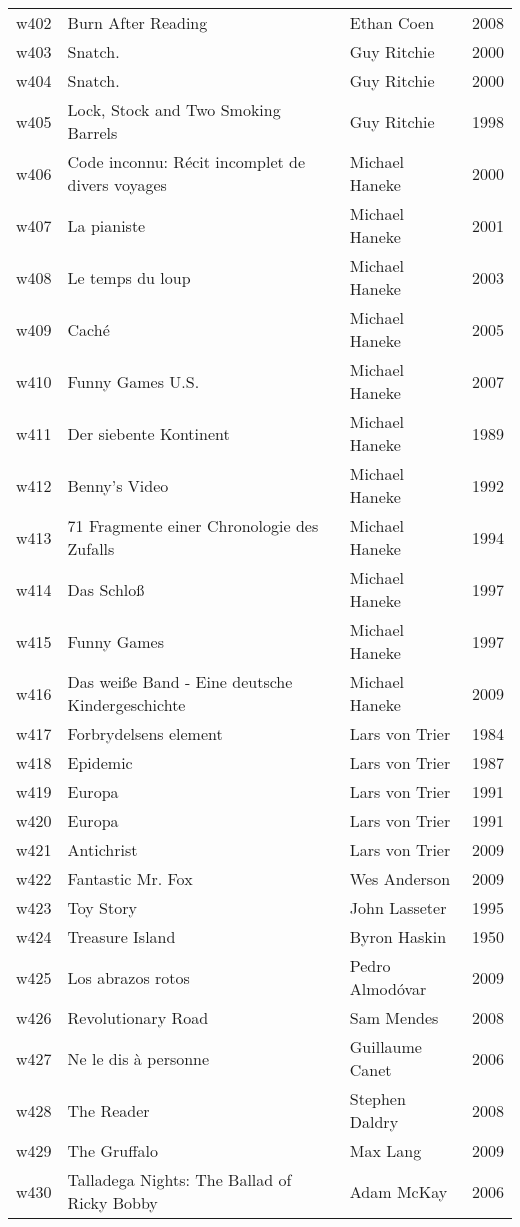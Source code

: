 \documentclass{article}
\begin{document}
\begin {center}
\begin{longtable}{l p{10cm} l l}
w402 & Burn After Reading & Ethan Coen & 2008 \\
w403 & Snatch. & Guy Ritchie & 2000 \\
w404 & Snatch. & Guy Ritchie & 2000 \\
w405 & Lock, Stock and Two Smoking Barrels & Guy Ritchie & 1998 \\
w406 & Code inconnu: Récit incomplet de divers voyages & Michael Haneke & 2000 \\
w407 & La pianiste & Michael Haneke & 2001 \\
w408 & Le temps du loup & Michael Haneke & 2003 \\
w409 & Caché & Michael Haneke & 2005 \\
w410 & Funny Games U.S. & Michael Haneke & 2007 \\
w411 & Der siebente Kontinent & Michael Haneke & 1989 \\
w412 & Benny's Video & Michael Haneke & 1992 \\
w413 & 71 Fragmente einer Chronologie des Zufalls & Michael Haneke & 1994 \\
w414 & Das Schloß & Michael Haneke & 1997 \\
w415 & Funny Games & Michael Haneke & 1997 \\
w416 & Das weiße Band - Eine deutsche Kindergeschichte & Michael Haneke & 2009 \\
w417 & Forbrydelsens element & Lars von Trier & 1984 \\
w418 & Epidemic & Lars von Trier & 1987 \\
w419 & Europa & Lars von Trier & 1991 \\
w420 & Europa & Lars von Trier & 1991 \\
w421 & Antichrist & Lars von Trier & 2009 \\
w422 & Fantastic Mr. Fox & Wes Anderson & 2009 \\
w423 & Toy Story & John Lasseter & 1995 \\
w424 & Treasure Island & Byron Haskin & 1950 \\
w425 & Los abrazos rotos & Pedro Almodóvar & 2009 \\
w426 & Revolutionary Road & Sam Mendes & 2008 \\
w427 & Ne le dis à personne & Guillaume Canet & 2006 \\
w428 & The Reader & Stephen Daldry & 2008 \\
w429 & The Gruffalo & Max Lang & 2009 \\
w430 & Talladega Nights: The Ballad of Ricky Bobby & Adam McKay & 2006 \\

\end{longtable}
\end{center}
\end{document}
